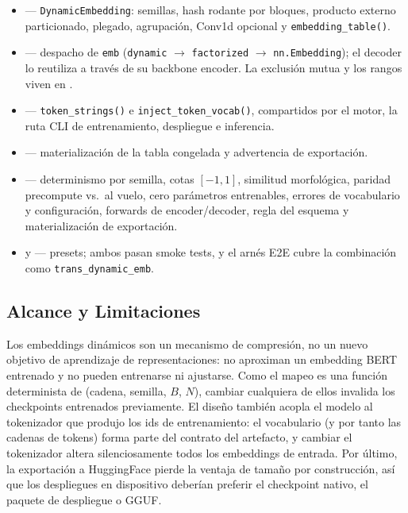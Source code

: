 \begin{itemize}[leftmargin=1.4em]
\item {} --- \texttt{DynamicEmbedding}: semillas, hash rodante por bloques, producto externo particionado, plegado, agrupación, Conv1d opcional y \texttt{embedding\_table()}.
\item {} --- despacho de \texttt{emb} (\texttt{dynamic} $\to$ \texttt{factorized} $\to$ \texttt{nn.Embedding}); el decoder lo reutiliza a través de su backbone encoder. La exclusión mutua y los rangos viven en .
\item {} --- \texttt{token\_strings()} e \texttt{inject\_token\_vocab()}, compartidos por el motor, la ruta CLI de entrenamiento, despliegue e inferencia.
\item {} --- materialización de la tabla congelada y advertencia de exportación.
\item {} --- determinismo por semilla, cotas $[-1,1]$, similitud morfológica, paridad precompute vs.\ al vuelo, cero parámetros entrenables, errores de vocabulario y configuración, forwards de encoder/decoder, regla del esquema y materialización de exportación.
\item {} y  --- presets; ambos pasan smoke tests, y el arnés E2E cubre la combinación como \texttt{trans\_dynamic\_emb}.
\end{itemize}

\subsection{Alcance y Limitaciones}

Los embeddings dinámicos son un mecanismo de compresión, no un nuevo objetivo de aprendizaje de representaciones: no aproximan un embedding BERT entrenado y no pueden entrenarse ni ajustarse. Como el mapeo es una función determinista de (cadena, semilla, $B$, $N$), cambiar cualquiera de ellos invalida los checkpoints entrenados previamente. El diseño también acopla el modelo al tokenizador que produjo los ids de entrenamiento: el vocabulario (y por tanto las cadenas de tokens) forma parte del contrato del artefacto, y cambiar el tokenizador altera silenciosamente todos los embeddings de entrada. Por último, la exportación a HuggingFace pierde la ventaja de tamaño por construcción, así que los despliegues en dispositivo deberían preferir el checkpoint nativo, el paquete de despliegue o GGUF.
